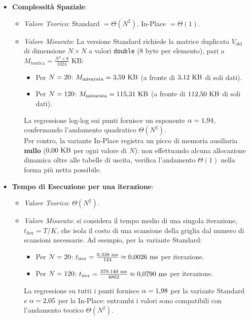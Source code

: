 \begin{itemize}
    \item \textbf{Complessità Spaziale}:
    \begin{itemize}
        \item \textit{Valore Teorico}: Standard $= \Theta(N^2)$, In-Place $= \Theta(1)$.
        \item \textit{Valore Misurato}: La versione Standard richiede la matrice duplicata $V_{\text{old}}$ di dimensione $N \times N$ a valori \texttt{double} ($8\text{ byte}$ per elemento), pari a $M_{\text{teorica}} = \frac{N^2 \times 8}{1024}\text{ KB}$:
        \begin{itemize}
            \item Per $N=20{}$: $M_{\text{misurata}} = 3{,}59{}\text{ KB}$ (a fronte di $3{,}12{}\text{ KB}$ di soli dati).
            \item Per $N=120{}$: $M_{\text{misurata}} = 115{,}31{}\text{ KB}$ (a fronte di $112{,}50{}\text{ KB}$ di soli dati).
        \end{itemize}
        La regressione log-log sui \benchNistanze{} punti fornisce un esponente $\alpha = 1{,}94{}$, confermando l'andamento quadratico $\Theta(N^2)$.\\
        Per contro, la variante In-Place registra un picco di memoria ausiliaria \textbf{nullo} ($0{,}00{}\text{ KB}$ per ogni valore di $N$): non effettuando alcuna allocazione dinamica oltre alle tabelle di uscita, verifica l'andamento $\Theta(1)$ nella forma più netta possibile.
    \end{itemize}

    \item \textbf{Tempo di Esecuzione per una iterazione}:
    \begin{itemize}
        \item \textit{Valore Teorico}: $\Theta(N^2)$.
        \item \textit{Valore Misurato}: si considera il tempo medio di una singola iterazione, $t_{\text{iter}} = T/K$, che isola il costo di una scansione della griglia dal numero di scansioni necessarie. Ad esempio, per la variante Standard:
        \begin{itemize}
            \item Per $N=20{}$: $t_{\text{iter}} = \frac{0{,}328{} \text{ ms}}{124{}} \approx 0{,}0026{} \text{ ms}$ per iterazione.
            \item Per $N=120{}$: $t_{\text{iter}} = \frac{379{,}140{} \text{ ms}}{4802{}} \approx 0{,}0790{} \text{ ms}$ per iterazione.
        \end{itemize}
        La regressione su tutti i punti fornisce $\alpha = 1{,}98{}$ per la variante Standard e $\alpha = 2{,}05{}$ per la In-Place: entrambi i valori sono compatibili con l'andamento teorico $\Theta(N^2)$.
    \end{itemize}


\end{itemize}
